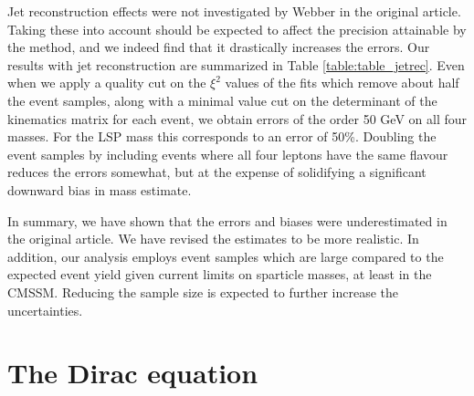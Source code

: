 \documentclass[twoside,english]{uiofysmaster}
\begin{document}
Jet reconstruction effects were not investigated by Webber in the original article. Taking these into account should be expected to affect the precision attainable by the method, and we indeed find that it drastically increases the errors. Our results with jet reconstruction are summarized in Table \ref{table:table_jetrec}. Even when we apply a quality cut on the $\xi^2$ values of the fits which remove about half the event samples, along with a minimal value cut on the determinant of the kinematics matrix for each event, we obtain errors of the order 50 GeV on all four masses. For the LSP mass this corresponds to an error of 50\%. Doubling the event samples by including events where all four leptons have the same flavour reduces the errors somewhat, but at the expense of solidifying a significant downward bias in mass estimate.

In summary, we have shown that the errors and biases were underestimated in the original article. We have revised the estimates to be more realistic. In addition, our analysis employs event samples which are large compared to the expected event yield given current limits on sparticle masses, at least in the CMSSM. Reducing the sample size is expected to further increase the uncertainties. 









































\appendix




\chapter{The Dirac equation}
\label{appendix:diraceq}
\end{document}
